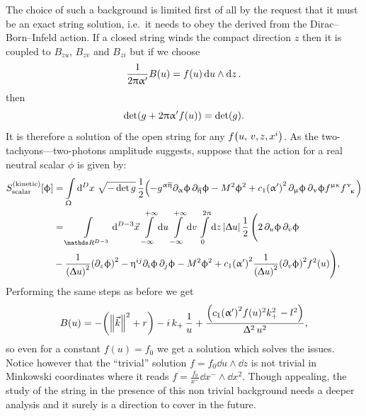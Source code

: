 The choice of such a background is limited first of all by the request that it must be an exact string solution, i.e.\ it needs to obey the \eom derived from the Dirac--Born--Infeld action.
If a closed string winds the compact direction $z$ then it is coupled to $B_{z u}$, $B_{z v}$  and $B_{z i}$ but if we choose
\begin{equation}
  \frac{1}{2\uppi\upalpha'} B(u)
  =
  f(u) \dd{u} \wedge \dd{z}.
  \label{eq:F_bck}
\end{equation}
then
\begin{equation}
  \det( g + 2 \uppi \upalpha' f(u) ) = \det(g).
\end{equation}
It is therefore a solution of the open string \eom for any $f\qty(u,\, v,z,x^i)$.
As the two-tachyons---two-photons amplitude suggests, suppose that the action for a real neutral scalar $\phi$ is given by:
\begin{equation}
  \begin{split}
    S_{\text{scalar}}^{(\text{kinetic})}\qty[ \phi ]
    & =
    \int\limits_{\Omega} \dd[D]{x}\,
    \sqrt{- \det g}\,
    \frac{1}{2}
    \qty(
      - g^{\alpha\beta}
      \ipd{\alpha} \phi\, \ipd{\beta} \phi
      - M^2 \phi^2
      + c_1
      \qty(\ap)^2\, \ipd{\mu} \phi\, \ipd{\nu} \phi
      \tensor{f}{^{\mu}^\kappa} \tensor{f}{^{\nu}_\kappa}
    )
    \\
    & =
    \int\limits_{\R^{D-3}} \dd[D-3]{\vec{x}}\,
    \infinfint{u}\,
    \infinfint{v}\,
    \finiteint{z}{0}{2\pi}
    \abs{\Delta u}\,
    \frac{1}{2}\,
    \Biggl(
      2\, \ipd{u} \phi\,\ipd{v} \phi\,
    \\
      & -
      \frac{1}{\qty(\Delta u )^2} \qty(\ipd{z}  \phi)^2
      -
      \eta^{ij} \ipd{i}\phi\, \ipd{j} \phi
      -
      M^2 \phi^2
      +
      c_1 \qty(\ap)^2 \frac{1}{\qty(\Delta u)^2} \qty(\ipd{v} \phi)^2 f^2(u)
    \Biggr)
    ,
  \end{split}
\end{equation}
Performing the same steps as before we get
\begin{equation}
  B(u)
  =
  - \qty(\norm{\vec{k}}^2 + r)
  -
  i\, k_+\, \frac{1}{u}
  +
  \frac{\qty(c_1 \qty(\upalpha')^2 f(u)^2 k_+^2 - l^2)}{\Updelta^2\, u^2},
\end{equation}
so even for a constant $f(u) = f_0$ we get a solution which solves the issues.
Notice however that the ``trivial'' solution $f = f_0 \dd{u} \wedge \dd{z}$ is not trivial in Minkowski coordinates where it reads $f = \frac{f_0}{x^-} \dd{x^-} \wedge \dd{x^2}$.
Though appealing, the study of the string in the presence of this non trivial background needs a deeper analysis and it surely is a direction to cover in the future.


